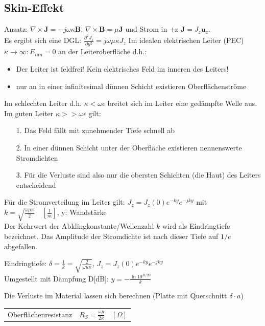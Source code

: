 \documentclass[english]{latex4ei/latex4ei_sheet}
\begin{document}
\begin{sectionbox}
\subsection{Skin-Effekt}
Ansatz: $\nabla \times \mathbf{J} = -j\omega\kappa \mathbf{B}$, $\nabla\times\mathbf{B} = \mu \mathbf{J}$ und Strom in +z $\mathbf{J} = J_z \mathbf{u}_z$.\\
Es ergibt sich eine DGL: $\frac{\partial^2 J_z}{\partial y^2} = j\omega \mu \kappa J_z$
Im idealen elektrischen Leiter (PEC) $\kappa \to \infty: E_{tan} = 0$ an der Leiteroberfläche d.h.:\\
\begin{itemize}
	\item Der Leiter ist feldfrei! Kein elektrisches Feld im inneren des Leiters!
	\item nur an in einer infinitesimal dünnen Schicht existieren Oberflächenströme
\end{itemize}
Im schlechten Leiter d.h. $\kappa < \omega\epsilon$ breitet sich im Leiter eine gedämpfte Welle aus.\\
Im guten Leiter $\kappa >> \omega\epsilon$ gilt:
\begin{itemize}
	\item[1.] Das Feld fällt mit zunehmender Tiefe schnell ab
	\item[2.] In einer dünnen Schicht unter der Oberfläche existieren nennenswerte Stromdichten
	\item[3.] Für die Verluste sind also nur die obersten Schichten (die Haut) des Leiters entscheidend
\end{itemize}
Für die Stromverteilung im Leiter gilt: $J_z = J_z(0) e^{-ky} e^{-jky}$ mit $k = \sqrt{\frac{\omega\mu\kappa}{2}}\quad[\frac{1}{m}]$, y: Wandstärke\\
Der Kehrwert der Abklingkonstante/Wellenzahl $k$ wird als Eindringtiefe bezeichnet. Das Amplitude der Stromdichte ist nach dieser Tiefe auf $1/e$ abgefallen.
\begin{emphbox}
Eindringtiefe: $\delta = \frac{1}{k} = \sqrt{\frac{2}{\omega \mu \kappa}}$, $J_z = J_z(0) e^{-ky} e^{-jky}$\\
Umgestellt mit Dämpfung D[dB]: $y = -\frac{\operatorname{ln}10^{D/20}}{k}$
\end{emphbox}
Die Verluste im Material lassen sich berechnen (Platte mit Querschnitt $\delta \cdot a$)\\
\begin{tabular*}{\columnwidth}{ll}
	Oberflächenresistanz & $R_S = \frac{\omega\mu}{2\kappa} \quad [\Omega]$ \\

\end{tabular*}
\end{sectionbox}
\end{document}
